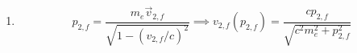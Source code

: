 \documentclass[fleqn]{article}[12pt]
\begin{document}
\begin{enumerate}
\begin{enumerate}
        \item
        \begin{equation*}
            p_{2,f} = \frac{m_e\vec{v}_{2,f}}{\sqrt{1-(v_{2,f}/c)^2}} \implies v_{2,f}(p_{2,f}) =
            \frac{c p_{2,f}}{\sqrt{c^2 m_e^2 + p_{2,f}^2}}
        \end{equation*}
    \end{enumerate}
\end{enumerate}
\end{document}
